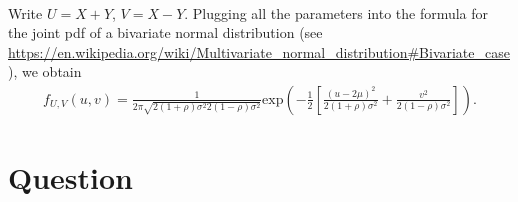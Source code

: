 \begin{exercise}
\begin{solution}
\begin{enumerate}
\begin{align}
    \end{align}
    Write $U = X+Y$, $V = X - Y$. Plugging all the parameters into the formula for the joint pdf of a bivariate normal distribution (see \url{https://en.wikipedia.org/wiki/Multivariate_normal_distribution#Bivariate_case}), we obtain
    \begin{align}
        f_{U,V}(u,v) = \frac{1}{2\pi\sqrt{2(1+\rho)\sigma^2 2(1-\rho)\sigma^2} } \text{exp}\left(-\frac{1}{2}\left[\frac{(u - 2\mu)^2}{2(1+\rho)\sigma^2} + \frac{v^2}{2(1-\rho)\sigma^2} \right]\right).
    \end{align}
\end{enumerate}
\end{solution}
\end{exercise}

\section*{Question}
\label{sec:question-3}


